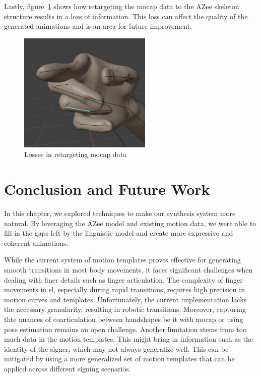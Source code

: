 \documentclass[../../main.tex]{subfiles}
\begin{document}
Lastly, figure~\ref{fig:losses} shows how retargeting the mocap data to the AZee skeleton structure results in a loss of information. This loss can affect the quality of the generated animations and is an area for future improvement.

\begin{figure}
  \centering \includegraphics[width = 2.5in]{chapters/intermediate_blocks_pose_correction/images/losses.png}
  \caption{Losses in retargeting mocap data}
  \label{fig:losses}
\end{figure}

\section{Conclusion and Future Work}
\label{ch:intermediate_blocks_pose_correction:conclusion_and_future_work}

In this chapter, we explored techniques to make our synthesis system more natural. By leveraging the AZee model and existing motion data, we were able to fill in the gaps left by the linguistic model and create more expressive and coherent animations. 

While the current system of motion templates proves effective for generating smooth transitions in most body movements, it faces significant challenges when dealing with finer details such as finger articulation. The complexity of finger movements in \gls{sl}, especially during rapid transitions, requires high precision in motion curves and templates. Unfortunately, the current implementation lacks the necessary granularity, resulting in robotic transitions. Moreover, capturing thte nuances of coarticulation between handshapes be it with mocap or using pose estimation remains an open challenge. Another limitation stems from too much data in the motion templates. This might bring in information such as the identity of the signer, which may not always generalize well. This can be mitigated by using a more generalized set of motion templates that can be applied across different signing scenarios.
\end{document}
